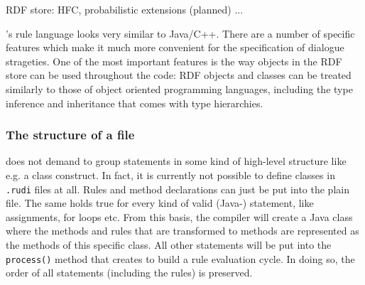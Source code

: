 RDF store: HFC, probabilistic extensions (planned) ...
\fi

\vonda's rule language looks very similar to Java/C++. There are a number of
specific features which make it much more convenient for the specification of
dialogue strageties. One of the most important features is the way objects in
the RDF store can be used throughout the code: RDF objects and classes can be
treated similarly to those of object oriented programming languages, including
the type inference and inheritance that comes with type hierarchies.




\subsubsection{The structure of a \vonda file}

%
\vonda does not demand to group statements in some kind of high-level structure like e.g. a class construct. In fact, it is currently not possible to define classes in \texttt{.rudi} files at all. Rules and method declarations can just be put into the plain file. The same holds true for every kind of valid (Java-) statement, like assignments, for loops etc. From this basis, the compiler will create a Java class where the methods and rules that are transformed to methods are represented as the methods of this specific class. All other statements will be put into the \texttt{process()} method that \vonda creates to build a rule evaluation cycle. In doing so, the order of all statements (including the rules) is preserved.

